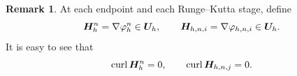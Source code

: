 \documentclass[11pt,a4paper]{article}
\newif\ifcurrentchanges
\newcommand{\chg}[1]{{\ifcurrentchanges\color{red}\fi#1}}
\newcommand{\bs}{\boldsymbol}
\DeclareMathOperator{\curl}{curl}
\theoremstyle{definition}
\newtheorem{remark}[remark]{Remark}
\numberwithin{equation}{section}
\begin{document}


\begin{remark}
At each endpoint and each Runge--Kutta stage, define
\begin{equation}\label{eq:discrete-H}
 \bs H_h^n=\nabla\varphi_h^n\in\bs U_h,\qquad\chg{\bs H_{h,n,i}=\nabla\varphi_{h,n,i}\in\bs U_h.}
\end{equation}
It is easy to see that
\begin{equation}\label{eq:curl-free}
 \curl\bs H_h^n=0,\qquad\chg{\curl\bs H_{h,n,j}=0.}
\end{equation}
\end{remark}

\end{document}
